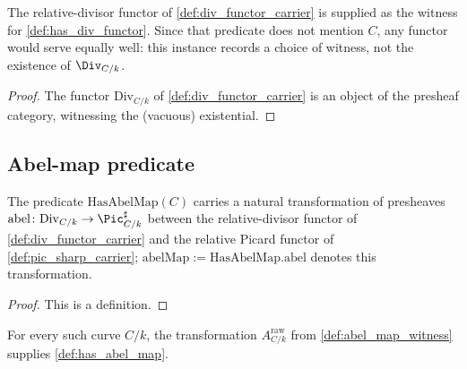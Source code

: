 \begin{definition}\leanok
  \label{def:inst_has_div_functor}
  The relative-divisor functor of \cref{def:div_functor_carrier} is supplied as
  the witness for \cref{def:has_div_functor}. Since that predicate does not
  mention \(C\), any functor would serve equally well: this instance records a
  choice of witness, not the existence of \(\Div_{C/k}\).
\end{definition}

\begin{proof}\leanok
  The functor \(\mathrm{Div}_{C/k}\) of \cref{def:div_functor_carrier} is an
  object of the presheaf category, witnessing the (vacuous) existential.
\end{proof}

\subsection{Abel-map predicate}
\label{subsec:fga_pic_abel_map_carrier}

\begin{definition}\leanok
  \label{def:has_abel_map}
  The predicate \(\mathrm{HasAbelMap}(C)\) carries a natural
  transformation of presheaves \(\mathrm{abel} \colon \mathrm{Div}_{C/k}
  \to \Pic^\sharp_{C/k}\) between the relative-divisor functor of
  \cref{def:div_functor_carrier} and the relative Picard functor of
  \cref{def:pic_sharp_carrier}; \(\mathrm{abelMap} :=
  \mathrm{HasAbelMap.abel}\) denotes this transformation.
\end{definition}

\begin{proof}
  This is a definition.
\end{proof}

\begin{definition}\leanok
  \label{def:inst_has_abel_map}
  For every such curve \(C/k\), the transformation
  \(A^{\mathrm{raw}}_{C/k}\) from \cref{def:abel_map_witness} supplies
  \cref{def:has_abel_map}.
\end{definition}

